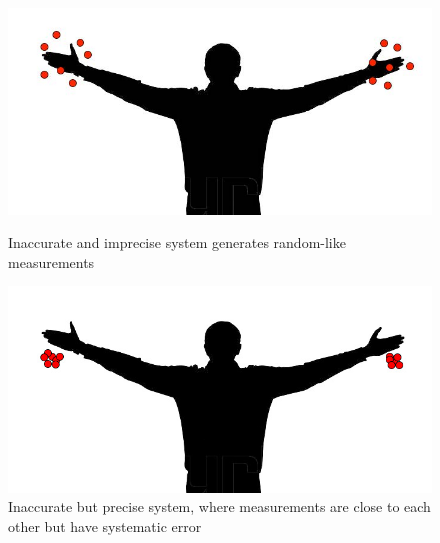 \begin{figure}[htb]
	\centering
	\begin{minipage}[t]{0.49\linewidth}
		\centering
		\includegraphics[width=1\linewidth]{Pictures/systemInaccurateImprecise}
		\caption{Inaccurate and imprecise system generates random-like measurements \cite{Woolford2015-ub}}
		\label{fig:systemInaccurateImprecise}
	\end{minipage}
	\hfill
	\begin{minipage}[t]{0.49\linewidth}
		\centering
		\includegraphics[width=1\linewidth]{Pictures/systemInaccuratePrecise}
		\caption{Inaccurate but precise system, where measurements are close to each other but have systematic error \cite{Woolford2015-ub}}
		\label{fig:systemInaccuratePrecise}
	\end{minipage}
\end{figure}

